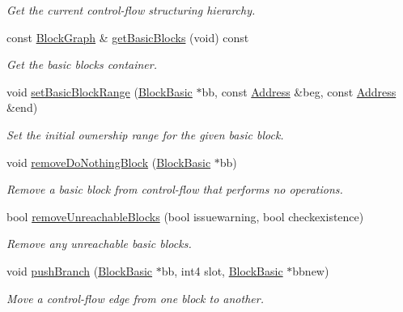 \begin{DoxyCompactItemize}
\begin{DoxyCompactList}\small\item\em Get the current control-\/flow structuring hierarchy. \end{DoxyCompactList}\item 
const \mbox{\hyperlink{class_block_graph}{Block\+Graph}} \& \mbox{\hyperlink{class_funcdata_add21153afa5eb571406d1f64b8b344db}{get\+Basic\+Blocks}} (void) const
\begin{DoxyCompactList}\small\item\em Get the basic blocks container. \end{DoxyCompactList}\item 
void \mbox{\hyperlink{class_funcdata_a15885a8369e2c43c8c7883a4fabd533e}{set\+Basic\+Block\+Range}} (\mbox{\hyperlink{class_block_basic}{Block\+Basic}} $\ast$bb, const \mbox{\hyperlink{class_address}{Address}} \&beg, const \mbox{\hyperlink{class_address}{Address}} \&end)
\begin{DoxyCompactList}\small\item\em Set the initial ownership range for the given basic block. \end{DoxyCompactList}\item 
void \mbox{\hyperlink{class_funcdata_aa486c5f0556919686a9fdad4ebc2dcc1}{remove\+Do\+Nothing\+Block}} (\mbox{\hyperlink{class_block_basic}{Block\+Basic}} $\ast$bb)
\begin{DoxyCompactList}\small\item\em Remove a basic block from control-\/flow that performs no operations. \end{DoxyCompactList}\item 
bool \mbox{\hyperlink{class_funcdata_a0fca3088c3d01a584aef0db49dfccc63}{remove\+Unreachable\+Blocks}} (bool issuewarning, bool checkexistence)
\begin{DoxyCompactList}\small\item\em Remove any unreachable basic blocks. \end{DoxyCompactList}\item 
void \mbox{\hyperlink{class_funcdata_aa2d635570305e3ea710ade3cf090ba8c}{push\+Branch}} (\mbox{\hyperlink{class_block_basic}{Block\+Basic}} $\ast$bb, int4 slot, \mbox{\hyperlink{class_block_basic}{Block\+Basic}} $\ast$bbnew)
\begin{DoxyCompactList}\small\item\em Move a control-\/flow edge from one block to another. \end{DoxyCompactList}\item 

\end{DoxyCompactItemize}
